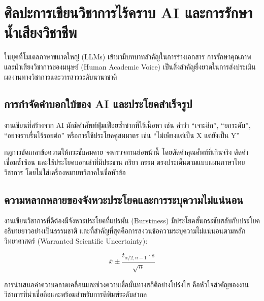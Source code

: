 \chapter{ศิลปะการเขียนวิชาการไร้คราบ AI และการรักษาน้ำเสียงวิชาชีพ}

ในยุคที่โมเดลภาษาขนาดใหญ่ (LLMs) เข้ามามีบทบาทสำคัญในการร่างเอกสาร การรักษาคุณภาพและน้ำเสียงวิชาการของมนุษย์ (Human Academic Voice) เป็นสิ่งสำคัญยิ่งยวดในการส่งประเมินผลงานทางวิชาการและวารสารระดับนานาชาติ

\section{การกำจัดคำบอกใบ้ของ AI และประโยคสำเร็จรูป}

งานเขียนที่สร้างจาก AI มักมีคำศัพท์ฟุ่มเฟือยซ้ำซากที่ไร้เนื้อหา เช่น คำว่า ``เจาะลึก'', ``ยกระดับ'', ``อย่างราบรื่นไร้รอยต่อ'' หรือการใช้ประโยคคู่สมมาตร เช่น ``ไม่เพียงแต่เป็น X แต่ยังเป็น Y''

\begin{aiprompt}{กฎการขัดเกลาข้อความให้กระชับคมคาย}
จงตรวจทานย่อหน้านี้ โดยตัดคำคุณศัพท์ที่เกินจริง ตัดคำเชื่อมซ้ำซ้อน และใช้ประโยคบอกเล่าที่มีประธาน กริยา กรรม ตรงประเด็นตามแบบแผนภาษาไทยวิชาการ โดยไม่ใส่เครื่องหมายทวิภาคในชื่อหัวข้อ
\end{aiprompt}

\section{ความหลากหลายของจังหวะประโยคและการระบุความไม่แน่นอน}

งานเขียนวิชาการที่ดีต้องมีจังหวะประโยคที่แปรผัน (Burstiness) มีประโยคสั้นกระชับสลับกับประโยคอธิบายยาวอย่างเป็นธรรมชาติ และที่สำคัญที่สุดคือการสงวนข้อความระบุความไม่แน่นอนตามหลักวิทยาศาสตร์ (Warranted Scientific Uncertainty):

\begin{equation}
\bar{x} \pm \frac{t_{\alpha/2, n-1} \cdot s}{\sqrt{n}}
\end{equation}

การนำเสนอค่าความคลาดเคลื่อนและช่วงความเชื่อมั่นทางสถิติอย่างโปร่งใส คือหัวใจสำคัญของงานวิชาการที่น่าเชื่อถือและพร้อมสำหรับการตีพิมพ์ระดับสากล
